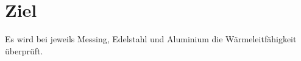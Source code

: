 \section{Ziel}
\label{sec:ziel}

Es wird bei jeweils Messing, Edelstahl und Aluminium die Wärmeleitfähigkeit überprüft.

